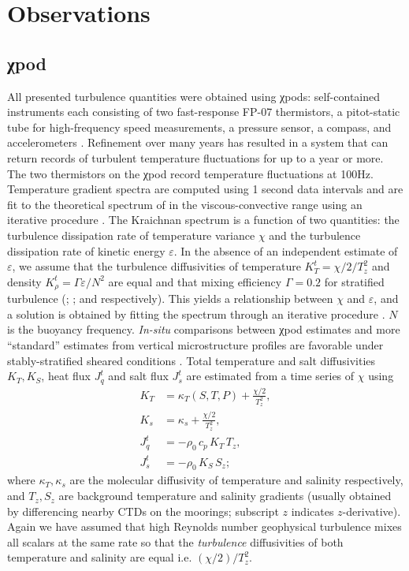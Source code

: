 \documentclass[twocol]{ametsoc}
\begin{document}
\section{Observations}
\label{sec:org8690ffb}
\label{sec:obs}

\subsection{χpod}
\label{sec:org94fefd7}
\label{sec:pod}

All presented turbulence quantities were obtained using χpods: self-contained instruments each consisting of two fast-response FP-07 thermistors, a pitot-static tube for high-frequency speed measurements, a pressure sensor, a compass, and accelerometers \citep{Moum2009a,Moum2015}.
Refinement over many years has resulted in a system that can return records of turbulent temperature fluctuations for up to a year or more.
The two thermistors on the χpod record temperature fluctuations at 100Hz.
Temperature gradient spectra are computed using 1 second data intervals and are fit to the theoretical spectrum of \cite{Kraichnan1968} in the viscous-convective range using an iterative procedure \citep{Moum2009a}.
The Kraichnan spectrum is a function of two quantities: the turbulence dissipation rate of temperature variance \(χ\)  and the turbulence dissipation rate of kinetic energy \(ε\).
In the absence of an independent estimate of \(ε\), we assume that the turbulence diffusivities of temperature  \(K^t_T = χ/2/T_z^2\) and density \(K^t_ρ = Γε/N^2\) are equal and that mixing efficiency \(Γ = 0.2\) for stratified turbulence (\citealp{Osborn1972}; \citealp{Osborn1980}; and \citealp{Gregg2018} respectively).
This yields a relationship between \(χ\) and \(ε\), and a solution is obtained by fitting the spectrum through an iterative procedure \citep{Moum2009a}.
\(N\) is the buoyancy frequency.
\emph{In-situ} comparisons between χpod estimates and more ``standard'' estimates from vertical microstructure profiles are favorable under stably-stratified sheared conditions \citep{Perlin2012,Pujiana2018}.
Total temperature and salt diffusivities \(K_T, K_S\), heat flux \(J_q^t\) and salt flux \(J_s^t\) are estimated from a time series of \(χ\) using
\begin{subequations}
\label{eq:def}
 \begin{align}
  K_T &= κ_T(S,T,P) + \frac{χ/2}{T_z^2}, \\
  K_s &= κ_s + \frac{χ/2}{T_z^2}, \\
  J_q^t &= - ρ_0\, c_p\, K_T\, T_z, \\
  J_s^t &= - ρ_0 \, K_S \, S_z;
\end{align}
\end{subequations}
where \(κ_T, κ_s\) are the molecular diffusivity of temperature and salinity respectively, and \(T_z, S_z\) are background temperature and salinity gradients (usually obtained by differencing nearby CTDs on the moorings; subscript \(z\) indicates \(z\)-derivative).
Again we have assumed that high Reynolds number geophysical turbulence mixes all scalars at the same rate so that the \emph{turbulence} diffusivities of both temperature and salinity are equal i.e. \((χ/2)/T_z^2\).
\end{document}
